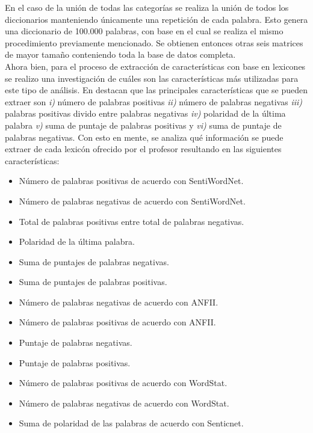 En el caso de la unión de todas las categorías se realiza la unión de todos los diccionarios manteniendo únicamente una repetición de cada palabra. Esto genera una diccionario de 100.000 palabras, con base en el cual se realiza el mismo procedimiento previamente mencionado. Se obtienen entonces otras seis matrices de mayor tamaño conteniendo toda la base de datos completa.\\

Ahora bien, para el proceso de extracción de características con base en lexicones se realizo una investigación de cuáles son las características más utilizadas para este tipo de análisis. En \cite{Paper_lexicones} destacan que las principales características que se pueden extraer son \textit{i)} número de palabras positivas \textit{ii)} número de palabras negativas \textit{iii)} palabras positivas divido entre palabras negativas \textit{iv)} polaridad de la última palabra \textit{v)} suma de puntaje de palabras positivas y \textit{vi)} suma de puntaje de palabras negativas. Con esto en mente, se analiza qué información se puede extraer de cada lexicón ofrecido por el profesor resultando en las siguientes características:

\begin{itemize}
    \item Número de palabras positivas de acuerdo con SentiWordNet.
    \item Número de palabras negativas de acuerdo con SentiWordNet.
    \item Total de palabras positivas entre total de palabras negativas.
    \item Polaridad de la última palabra.
    \item Suma de puntajes de palabras negativas.
    \item Suma de puntajes de palabras positivas.
    \item Número de palabras negativas de acuerdo con ANFII.
    \item Número de palabras positivas de acuerdo con ANFII.
    \item Puntaje de palabras negativas.
    \item Puntaje de palabras positivas.
    \item Número de palabras positivas de acuerdo con WordStat.
    \item Número de palabras negativas de acuerdo con WordStat.
    \item Suma de polaridad de las palabras de acuerdo con Senticnet.
\end{itemize}

